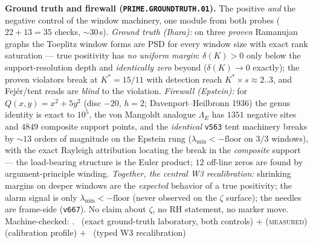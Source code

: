\par\smallskip\noindent\textbf{Ground truth and firewall
(\texttt{PRIME.GROUNDTRUTH.01}).}
The positive \emph{and} the negative control of the window
machinery, one module from both probes ($22+13=35$ checks,
${\sim}30$\,s).  \emph{Ground truth (Ihara):} on three \emph{proven}
Ramanujan graphs the Toeplitz window forms are PSD for every window
size with exact rank saturation --- true positivity has \emph{no
uniform margin}: $\delta(K)>0$ only below the support-resolution
depth and \emph{identically zero} beyond ($\delta(K)\to0$ exactly);
the proven violators break at $K^*=15/11$ with detection reach
$K^*\times s\approx2..3$, and Fej\'er/tent reads are \emph{blind} to
the violation.  \emph{Firewall (Epstein):} for
$Q(x,y)=x^2+5y^2$ (disc $-20$, $h=2$; Davenport--Heilbronn 1936) the
genus identity is exact to $10^5$, the von Mangoldt analogue
$\Lambda_E$ has $1351$ negative sites and $4849$ composite support
points, and the \emph{identical} \texttt{v563} tent machinery breaks
by ${\sim}13$ orders of magnitude on the Epstein rung
($\lambda_{\min}<-\mathrm{floor}$ on $3/3$ windows), with the exact
Rayleigh attribution locating the break in the \emph{composite}
support --- the load-bearing structure is the Euler product; $12$
off-line zeros are found by argument-principle winding.
\emph{Together, the central W3 recalibration:} shrinking margins on
deeper windows are the \emph{expected} behavior of a true
positivity; the alarm signal is only $\lambda_{\min}<-\mathrm{floor}$
(never observed on the $\zeta$ surface); the needles are frame-side
(\texttt{v667}).  No claim about $\zeta$, no RH statement, no marker
move.
Machine-checked: .
\mE\ (exact ground-truth laboratory, both controls) $+$
(\textsc{measured}) (calibration profile) $+$ \mC\ (typed W3
recalibration)
\par\smallskip


